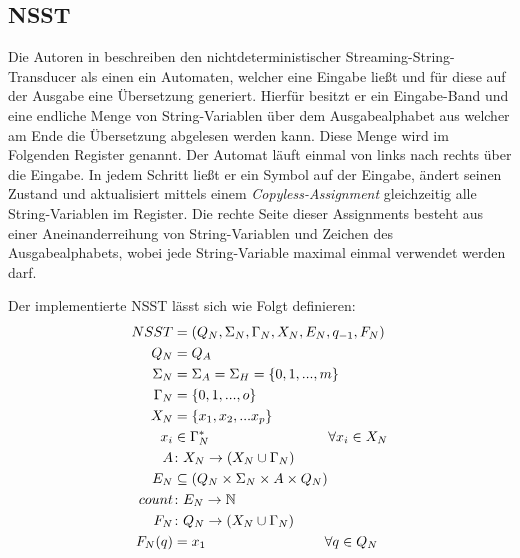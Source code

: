 \documentclass[conference]{IEEEtran}
\begin{document}
\subsection{NSST}
Die Autoren in \cite{nsst} beschreiben den nichtdeterministischer Streaming-String-Transducer als einen ein Automaten, welcher eine Eingabe ließt und für diese auf der Ausgabe eine Übersetzung generiert.
Hierfür besitzt er ein Eingabe-Band und eine endliche Menge von String-Variablen über dem Ausgabealphabet aus welcher am Ende die Übersetzung abgelesen werden kann.
Diese Menge wird im Folgenden Register genannt.
Der Automat läuft einmal von links nach rechts über die Eingabe.
In jedem Schritt ließt er ein Symbol auf der Eingabe, ändert seinen Zustand und aktualisiert mittels einem \textit{Copyless-Assignment} gleichzeitig alle String-Variablen im Register.
Die rechte Seite dieser Assignments besteht aus einer Aneinanderreihung von String-Variablen und Zeichen des Ausgabealphabets, wobei jede String-Variable maximal einmal verwendet werden darf.

Der implementierte NSST lässt sich wie Folgt definieren:
\begin{equation}\notag
    \begin{aligned}
        NSST &= (Q_N, \Sigma_N, \Gamma_N,X_N, E_N, q_{-1}, F_N) \\
        Q_N &= Q_A \\
        \Sigma_N &= \Sigma_A = \Sigma_H = \{0,1,..., m\} \\
        \Gamma_N &= \{0,1,..., o\} \\
        X_N &= \{x_1, x_2, ... x_p\} \\
        x_i &\in \Gamma_N^* \hspace{3cm} \forall x_i \in X_N\\
        A &\colon X_N \rightarrow (X_N \cup \Gamma_N) \\
        E_N & \subseteq (Q_N \times \Sigma_N \times A \times Q_N) \\
        count &\colon E_N \rightarrow \mathbb{N}\\
        F_N &\colon Q_N \rightarrow (X_N \cup \Gamma_N)\\
        F_N(q) &= x_1  \hspace{3cm} \forall q \in Q_N\\
    \end{aligned}
\end{equation}
\end{document}
